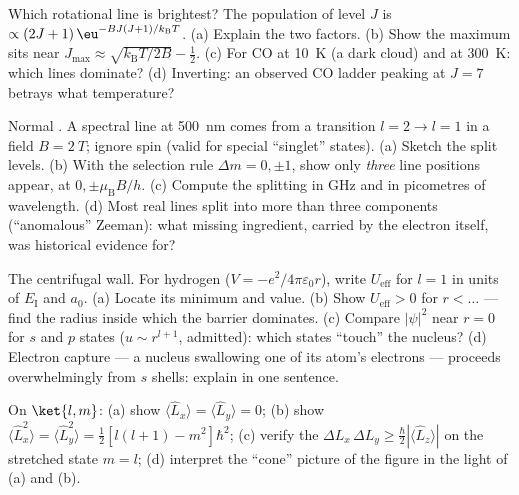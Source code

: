 \begin{exercise}[$\star\star$]\label{exo:b3:quantum-angular-momentum:6}
Which rotational line is brightest? The population of level $J$ is
$\propto (2J+1)\,\eu^{-BJ(J+1)/k_{\text{B}}T}$. (a) Explain the two
factors. (b) Show the maximum sits near $J_{\max} \approx
\sqrt{k_{\text{B}}T/2B} - \tfrac12$. (c) For CO at \qty{10}{K}
(a dark cloud) and at \qty{300}{K}: which lines dominate? (d)
Inverting: an observed CO ladder peaking at $J = 7$ betrays what
temperature?
\end{exercise}

\begin{exercise}[$\star\star$]\label{exo:b3:quantum-angular-momentum:7}
Normal . A spectral line at \qty{500}{nm} comes from a
transition $l = 2 \to l = 1$ in a field $B = \qty{2}{T}$; ignore
spin (valid for special ``singlet'' states). (a) Sketch the split
levels. (b) With the selection rule $\Delta m = 0, \pm1$, show only
\emph{three} line positions appear, at $0, \pm\mu_{\text{B}}B/h$.
(c) Compute the splitting in GHz and in picometres of wavelength.
(d) Most real lines split into more than three components
(``anomalous'' Zeeman): what missing ingredient, carried by the
electron itself, was historical evidence for?
\end{exercise}

\begin{exercise}[$\star\star$]\label{exo:b3:quantum-angular-momentum:8}
The centrifugal wall. For hydrogen ($V = -e^2/4\pi\varepsilon_0r$),
write $U_{\text{eff}}$ for $l = 1$ in units of $E_{\text{I}}$ and
$a_0$. (a) Locate its minimum and value. (b) Show $U_{\text{eff}} >
0$ for $r < \dots$ --- find the radius inside which the barrier
dominates. (c) Compare $|\psi|^2$ near $r = 0$ for $s$ and $p$
states ($u \sim r^{l+1}$, admitted): which states ``touch'' the
nucleus? (d) Electron capture --- a nucleus swallowing one of its
atom's electrons --- proceeds overwhelmingly from $s$ shells:
explain in one sentence.
\end{exercise}

\begin{exercise}[$\star\star$]\label{exo:b3:quantum-angular-momentum:9}
On $\ket{l, m}$: (a) show $\langle\hat L_x\rangle = \langle\hat
L_y\rangle = 0$; (b) show $\langle\hat L_x^2\rangle = \langle\hat
L_y^2\rangle = \tfrac12[l(l+1) - m^2]\hbar^2$; (c) verify the
 $\Delta L_x\,\Delta L_y \ge \tfrac\hbar2
|\langle\hat L_z\rangle|$ on the stretched state $m = l$; (d)
interpret the ``cone'' picture of the figure in the light of (a) and
(b).
\end{exercise}

